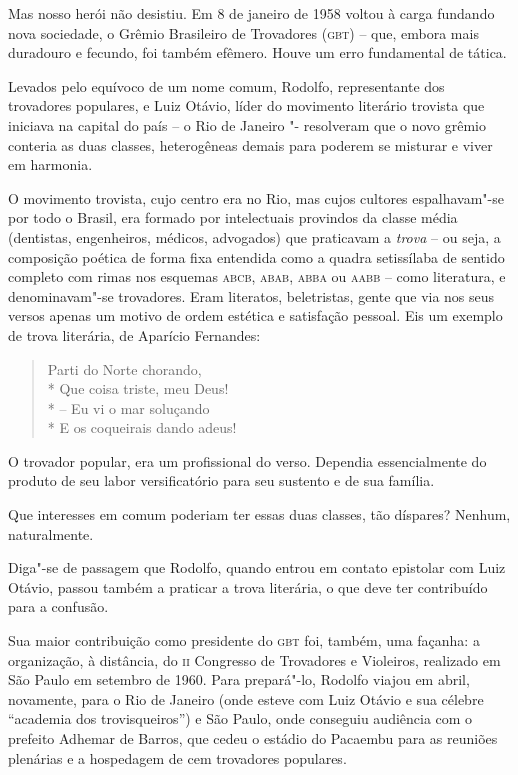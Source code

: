 Mas nosso herói não desistiu. Em 8 de janeiro de 1958 voltou à carga
fundando nova sociedade, o Grêmio Brasileiro de Trovadores (\textsc{gbt}) --
que, embora mais duradouro e fecundo, foi também efêmero. Houve um erro
fundamental de tática.

Levados pelo equívoco de um nome comum, Rodolfo, representante dos
trovadores populares, e Luiz Otávio, líder do movimento literário
trovista que iniciava na capital do país -- o Rio de Janeiro "-
resolveram que o novo grêmio conteria as duas classes, heterogêneas
demais para poderem se misturar e viver em harmonia.

O movimento trovista, cujo centro era no Rio, mas cujos cultores
espalhavam"-se por todo o Brasil, era formado por intelectuais
provindos da classe média (dentistas, engenheiros, médicos, advogados)
que praticavam a \textit{trova} -- ou seja, a composição poética de
forma fixa entendida como a quadra setissílaba de sentido completo com
rimas nos esquemas \textsc{abcb}, \textsc{abab}, \textsc{abba} ou \textsc{aabb} -- como literatura, e
denominavam"-se trovadores. Eram literatos, beletristas, gente que via
nos seus versos apenas um motivo de ordem estética e satisfação
pessoal. Eis um exemplo de trova literária, de Aparício Fernandes:


\begin{verse}
Parti do Norte chorando,\\*
Que coisa triste, meu Deus!\\*
-- Eu vi o mar soluçando\\*
E os coqueirais dando adeus!
\end{verse}

O trovador popular, era um profissional do verso. Dependia
essencialmente do produto de seu labor versificatório para seu sustento
e de sua família.

Que interesses em comum poderiam ter essas duas classes, tão díspares?
Nenhum, naturalmente.

Diga"-se de passagem que Rodolfo, quando entrou em contato epistolar
com Luiz Otávio, passou também a praticar a trova literária, o que deve
ter contribuído para a confusão.

Sua maior contribuição como presidente do \textsc{gbt} foi, também, uma façanha:
a organização, à distância, do \textsc{ii} Congresso de Trovadores e Violeiros,
realizado em São Paulo em setembro de 1960. Para prepará"-lo, Rodolfo
viajou em abril, novamente, para o Rio de Janeiro (onde esteve com Luiz
Otávio e sua célebre ``academia dos
trovisqueiros'') e São Paulo, onde conseguiu audiência com
o prefeito Adhemar de Barros, que cedeu o estádio do Pacaembu para as
reuniões plenárias e a hospedagem de cem trovadores populares.

